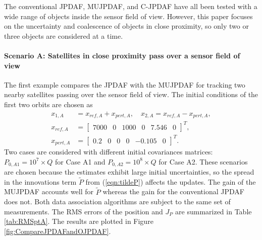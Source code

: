 \documentclass[letterpaper, 10pt, conference]{ieeeconf}
\newcommand{\refeqn}[1]{(\ref{eqn:#1})}
\begin{document}
The conventional JPDAF, MUJPDAF, and C-JPDAF have all been tested with a wide range of objects inside the sensor field of view.
However, this paper focuses on the uncertainty and coalescence of objects in close proximity, so only two or three objects are considered at a time.

\paragraph*{Scenario A: Satellites in close proximity pass over a sensor field of view}
The first example compares the JPDAF with the MUJPDAF for tracking two nearby satellites passing over the sensor field of view. The initial conditions of the first two orbits are chosen as
\begin{align}
x_{1,A} & =x_{ref,A}+x_{pert,A}, \quad x_{2,A}=x_{ref,A}-x_{pert,A},\nonumber
\\
x_{ref,A} & =\begin{bmatrix}7000 & 0 & 1000 & 0 & 7.546 & 0\end{bmatrix}^T,\nonumber
\\
 x_{pert,A} & =\begin{bmatrix}
0.2 & 0 & 0 & 0 & -0.105 & 0
\end{bmatrix}^T.
\end{align}
Two cases are considered with different initial covariances matrices: $P_{0,A1}=10^7\times Q$ for Case A1 and $P_{0,A2}=10^8\times Q$ for Case A2.
These scenarios are chosen because the estimates exhibit large initial uncertainties, so the spread in the innovations term $\tilde P$ from \refeqn{tildeP} affects the updates.
The gain of the MUJPDAF accounts well for $\tilde P$ whereas the gain for the conventional JPDAF does not.
Both data association algorithms are subject to the same set of measurements.
The RMS errors of the position and $J_P$ are summarized in Table \ref{tab:RMSptA}.
The results are plotted in Figure \ref{fig:CompareJPDAFandOJPDAF}.
\end{document}
